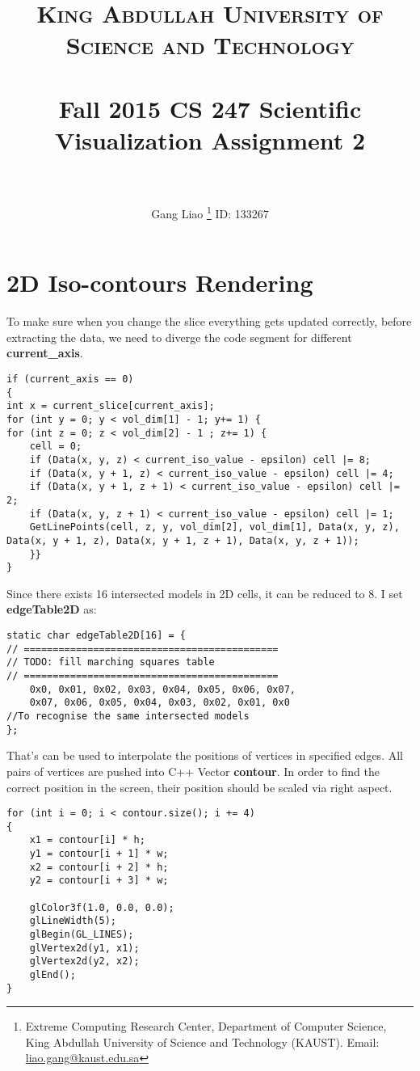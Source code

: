 \documentclass[12pt,letterpaper,fleqn]{article}          %
\title{
		\usefont{OT1}{bch}{b}{n}
		\normalfont \normalsize \textsc{ \fontspec{Zapfino} King Abdullah University of Science and Technology} \\ [25pt]
		\horrule{0.5pt} \\[0.4cm]
         \Large Fall 2015 CS 247 Scientific Visualization Assignment 2\\
		\horrule{2pt} \\
}
\author{Gang Liao \footnote{Extreme Computing Research Center, Department of Computer Science, King Abdullah University of Science and Technology (KAUST).  Email: \href{mailto:liao.gang@kaust.edu.sa}{liao.gang@kaust.edu.sa}} \hspace{1.05cm}ID: 133267 }
\begin{document}
\maketitle

\onehalfspacing

\section{2D Iso-contours Rendering}
To make sure when you change the slice everything gets updated correctly, before extracting the data, we need to diverge the code segment 
for different \textbf{current\_axis}. 

\begin{lstlisting}
if (current_axis == 0)
{
int x = current_slice[current_axis];
for (int y = 0; y < vol_dim[1] - 1; y+= 1) {
for (int z = 0; z < vol_dim[2] - 1 ; z+= 1) {
	cell = 0;
	if (Data(x, y, z) < current_iso_value - epsilon) cell |= 8;
	if (Data(x, y + 1, z) < current_iso_value - epsilon) cell |= 4;
	if (Data(x, y + 1, z + 1) < current_iso_value - epsilon) cell |= 2;
	if (Data(x, y, z + 1) < current_iso_value - epsilon) cell |= 1;
	GetLinePoints(cell, z, y, vol_dim[2], vol_dim[1], Data(x, y, z), Data(x, y + 1, z), Data(x, y + 1, z + 1), Data(x, y, z + 1));			
	}}
}				
\end{lstlisting}

Since there exists 16 intersected models in 2D cells, it can be reduced to 8.  I set \textbf{edgeTable2D} as:

\begin{lstlisting}
static char edgeTable2D[16] = {
// ============================================
// TODO: fill marching squares table
// ============================================
	0x0, 0x01, 0x02, 0x03, 0x04, 0x05, 0x06, 0x07,
	0x07, 0x06, 0x05, 0x04, 0x03, 0x02, 0x01, 0x0
//To recognise the same intersected models	
};				
\end{lstlisting}

That's can be used to interpolate the positions of vertices in specified edges. All pairs of vertices are pushed into C++ Vector \textbf{contour}.
In order to find the correct position in the screen, their position should be scaled via right aspect.
\begin{lstlisting}
for (int i = 0; i < contour.size(); i += 4)
{
	x1 = contour[i] * h;
	y1 = contour[i + 1] * w;
	x2 = contour[i + 2] * h;
	y2 = contour[i + 3] * w;

	glColor3f(1.0, 0.0, 0.0);
	glLineWidth(5);
	glBegin(GL_LINES);
	glVertex2d(y1, x1);
	glVertex2d(y2, x2);
	glEnd();
}
\end{lstlisting}
\newpage
\end{document}
